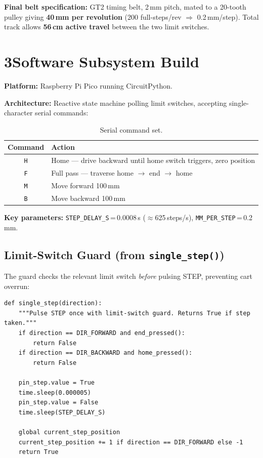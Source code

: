 \documentclass[12pt]{article}
\begin{document}
\textbf{Final belt specification:} GT2 timing belt, 2\,mm pitch, mated to a
20-tooth pulley giving \textbf{40\,mm per revolution} (200 full-steps/rev
$\Rightarrow$ 0.2\,mm/step).  Total track allows \textbf{56\,cm active travel}
between the two limit switches.

\section{3\quad Software Subsystem Build}

\textbf{Platform:} Raspberry Pi Pico running CircuitPython.

\textbf{Architecture:} Reactive state machine polling limit switches, accepting single-character serial commands:

\begin{table}[H]
\centering
\small
\begin{tabular}{@{}c l@{}}
\toprule
\textbf{Command} & \textbf{Action} \\
\midrule
\texttt{H} & Home --- drive backward until home switch triggers, zero position \\
\texttt{F} & Full pass --- traverse home $\rightarrow$ end $\rightarrow$ home \\
\texttt{M} & Move forward 100\,mm \\
\texttt{B} & Move backward 100\,mm \\
\bottomrule
\end{tabular}
\caption{Serial command set.}
\end{table}

\textbf{Key parameters:}
\texttt{STEP\_DELAY\_S}\,=\,0.0008\,s ($\approx$625\,steps/s),\quad
\texttt{MM\_PER\_STEP}\,=\,0.2\,mm.

\subsection{Limit-Switch Guard (from \texttt{single\_step()})}

The guard checks the relevant limit switch \emph{before} pulsing STEP, preventing cart overrun:

\begin{lstlisting}[style=pystyle]
def single_step(direction):
    """Pulse STEP once with limit-switch guard. Returns True if step taken."""
    if direction == DIR_FORWARD and end_pressed():
        return False
    if direction == DIR_BACKWARD and home_pressed():
        return False

    pin_step.value = True
    time.sleep(0.000005)
    pin_step.value = False
    time.sleep(STEP_DELAY_S)

    global current_step_position
    current_step_position += 1 if direction == DIR_FORWARD else -1
    return True
\end{lstlisting}
\end{document}
